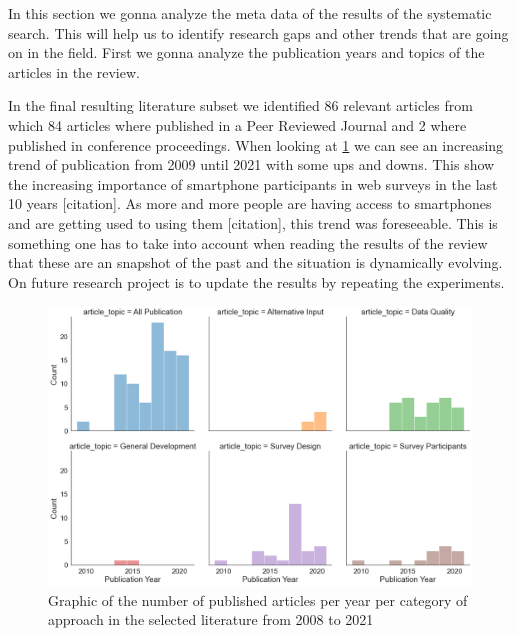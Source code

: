 In this section we gonna analyze the meta data of the results of the systematic search. This will help us to identify research gaps and other trends that are going on in the field. First we gonna analyze the publication years and topics of the articles in the review.

In the final resulting literature subset we identified 86 relevant articles from which 84 articles where published in a Peer Reviewed Journal and 2 where published in conference proceedings. When looking at \ref{fig: publications_per_year_per_categories} we can see an increasing trend of publication from 2009 until 2021 with some ups and downs. This show the increasing importance of smartphone participants in web surveys in the last 10 years [citation]. As more and more people are having access to smartphones and are getting used to using them [citation], this trend was foreseeable. This is something one has to take into account when reading the results of the review that these are an snapshot of the past and the situation is dynamically evolving. On future research project is to update the results by repeating the experiments.

\begin{figure}
    \centering
    \includegraphics[width=\textwidth]{reports/figures/publications_per_year_per_categories.png}
     \caption{Graphic of the number of published articles per year per category of approach in the selected literature from 2008 to 2021}
    \label{fig: publications_per_year_per_categories}
\end{figure}

